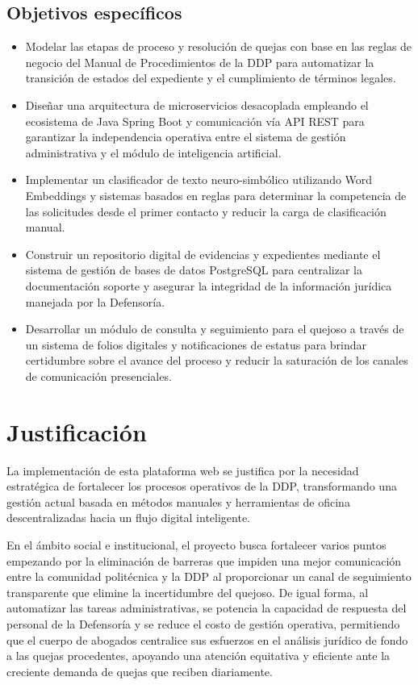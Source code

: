         \subsection{Objetivos específicos}
            \begin{itemize}
                \item Modelar las etapas de proceso y resolución de quejas con base en las reglas de negocio del Manual de Procedimientos de la DDP para automatizar la transición de estados del expediente y el cumplimiento de términos legales.
                \item Diseñar una arquitectura de microservicios desacoplada empleando el ecosistema de Java Spring Boot y comunicación vía API REST para garantizar la independencia operativa entre el sistema de gestión administrativa y el módulo de inteligencia artificial.
                \item Implementar un clasificador de texto neuro-simbólico utilizando Word Embeddings y sistemas basados en reglas para determinar la competencia de las solicitudes desde el primer contacto y reducir la carga de clasificación manual.
                \item Construir un repositorio digital de evidencias y expedientes mediante el sistema de gestión de bases de datos PostgreSQL para centralizar la documentación soporte y asegurar la integridad de la información jurídica manejada por la Defensoría.
                \item Desarrollar un módulo de consulta y seguimiento para el quejoso a través de un sistema de folios digitales y notificaciones de estatus para brindar certidumbre sobre el avance del proceso y reducir la saturación de los canales de comunicación presenciales.
            \end{itemize}

    \section{Justificación}

        La implementación de esta plataforma web se justifica por la necesidad estratégica de fortalecer los procesos operativos de la DDP, transformando una gestión actual basada en métodos manuales y herramientas de oficina descentralizadas hacia un flujo digital inteligente. 
        
        En el ámbito social e institucional, el proyecto busca fortalecer varios puntos empezando por la eliminación de barreras que impiden una mejor comunicación entre la comunidad politécnica y la DDP al proporcionar un canal de seguimiento transparente que elimine la incertidumbre del quejoso. De igual forma, al automatizar las tareas administrativas, se potencia la capacidad de respuesta del personal de la Defensoría y se reduce el costo de gestión operativa, permitiendo que el cuerpo de abogados centralice sus esfuerzos en el análisis jurídico de fondo a las quejas procedentes, apoyando una atención equitativa y eficiente ante la creciente demanda de quejas que reciben diariamente.
        
